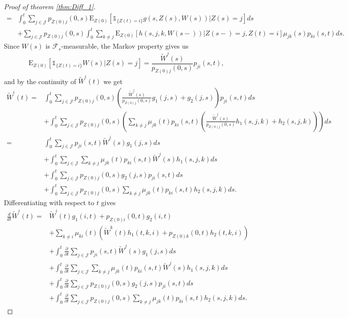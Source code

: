 \documentclass[12pt]{article}
\newcommand{\E}{\text{E}}
\newcommand{\indic}[1]{\mathds{1}_{ \{ #1 \} }}
\theoremstyle{my_thm}
\begin{document}
\begin{proof}[Proof of theorem \ref{thm:Diff_1}]
\begin{align*}
=&
\int_0^t \sum_{j \in \mathcal{J}} p_{Z(0)j}(0,s) \E_{Z(0)} \left[ \indic{Z(t)=i} g(s,Z(s),W(s))|Z(s)=j\right] ds
\\
&+
\sum_{j \in \mathcal{J}} p_{Z(0)j}(0,s)  \int_0^t \sum_{k \neq j }   \E_{Z(0)} \left[ h(s,j,k,W(s-))  |Z(s-)=j,Z(t)=i \right] \mu_{jk}(s)p_{ki}(s,t) ds.
\end{align*}
Since $W(s)$ is $\mathcal{F}_s$-measurable, the Markov property gives us
$$
\E_{Z(0)}[\indic{Z(t)=i}W(s)|Z(s)=j]=\frac{\tilde{W}^j(s)}{p_{Z(0)j}(0,s)}p_{ji}(s,t), 
$$
and by the continuity of $\tilde{W}^i(t)$ we get
\begin{align*}
\tilde{W}^i(t)=&
\int_0^t \sum_{j \in \mathcal{J}} p_{Z(0)j}(0,s)\left( \frac{\tilde{W}^j(s)}{p_{Z(0)j}(0,s)}g_1(j,s)+g_2(j,s)\right)p_{ji}(s,t) ds
\\
&+
\int_0^t \sum_{j \in \mathcal{J}} p_{Z(0)j}(0,s)  \left( \sum_{k \neq j}  \mu_{jk}(t)p_{ki}(s,t) \left(  \frac{\tilde{W}^j(s)}{p_{Z(0)j}(0,s)} h_1(s,j,k)+h_2(s,j,k)  \right) \right) ds
\\
=&
\int_0^t \sum_{j \in \mathcal{J}} p_{ji}(s,t) \tilde{W}^j(s)g_1(j,s) ds
\\
&+
\int_0^t \sum_{j \in \mathcal{J}} \sum_{k \neq j}  \mu_{jk}(t) p_{ki}(s,t) \tilde{W}^j(s) h_1(s,j,k)  ds
\\
&+
\int_0^t \sum_{j \in \mathcal{J}} p_{Z(0)j}(0,s)g_2(j,s)p_{ji}(s,t) ds
\\
&+
\int_0^t \sum_{j \in \mathcal{J}} p_{Z(0)j}(0,s)  \sum_{k \neq j}  \mu_{jk}(t) p_{ki}(s,t)h_2(s,j,k) ds.
\end{align*}
Differentiating with respect to $t$ gives
\begin{align*}
\frac{d}{dt}\tilde{W}^i(t)=&
 \tilde{W}^i(t)g_1(i,t)+p_{Z(0)i}(0,t)g_2(i,t)\\
&+
\sum_{k \neq i} \mu_{ki}(t) \left( \tilde{W}^k(t) h_1(t,k,i) + p_{Z(0)k}(0,t)h_2(t,k,i) \right)
\\
&+
\int_0^t \frac{\partial}{\partial t}  \sum_{j \in \mathcal{J}} p_{ji}(s,t) \tilde{W}^j(s)g_1(j,s) ds
\\
&+
\int_0^t \frac{\partial}{\partial t}  \sum_{j \in \mathcal{J}} \sum_{k \neq j}  \mu_{jk}(t) p_{ki}(s,t) \tilde{W}^j(s) h_1(s,j,k)  ds
\\
&+
\int_0^t \frac{\partial}{\partial t}  \sum_{j \in \mathcal{J}} p_{Z(0)j}(0,s)g_2(j,s)p_{ji}(s,t) ds
\\
&+
\int_0^t \frac{\partial}{\partial t} \sum_{j \in \mathcal{J}} p_{Z(0)j}(0,s)  \sum_{k \neq j}  \mu_{jk}(t) p_{ki}(s,t)h_2(s,j,k) ds.
\end{align*}

\end{proof}
\end{document}
